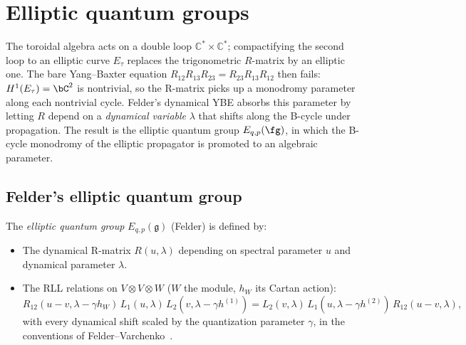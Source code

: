 \section{Elliptic quantum groups}
\label{sec:elliptic-quantum}

The toroidal algebra acts on a double loop $\mathbb{C}^* \times \mathbb{C}^*$;
compactifying the second loop to an elliptic curve $E_\tau$ replaces the
trigonometric $R$-matrix by an elliptic one. The bare Yang--Baxter equation
$R_{12} R_{13} R_{23} = R_{23} R_{13} R_{12}$ then fails: $H^1(E_\tau) = \bC^2$
is nontrivial, so the R-matrix picks up a monodromy parameter along each
nontrivial cycle. Felder's dynamical YBE absorbs this parameter by letting
$R$ depend on a \emph{dynamical variable} $\lambda$ that shifts along the
B-cycle under propagation. The result is the elliptic quantum group
$E_{q,p}(\fg)$, in which the B-cycle monodromy of the elliptic propagator
is promoted to an algebraic parameter.

\subsection{Felder's elliptic quantum group}

\begin{definition}\label{def:elliptic-quantum}
The \emph{elliptic quantum group} $E_{q,p}(\mathfrak{g})$ (Felder) is defined by:
\begin{itemize}
\item The dynamical R-matrix $R(u, \lambda)$ depending on spectral parameter $u$
and dynamical parameter $\lambda$.
\item The RLL relations on $V \otimes V \otimes W$ ($W$ the module,
$h_W$ its Cartan action):
\[
R_{12}(u-v, \lambda - \gamma h_W)\, L_1(u, \lambda)\,
L_2(v, \lambda - \gamma h^{(1)})
= L_2(v, \lambda)\, L_1(u, \lambda - \gamma h^{(2)})\,
R_{12}(u-v, \lambda),
\]
with every dynamical shift scaled by the quantization parameter
$\gamma$, in the conventions of
Felder--Varchenko~\cite{FelderVarchenko96}.
\end{itemize}
\end{definition}

